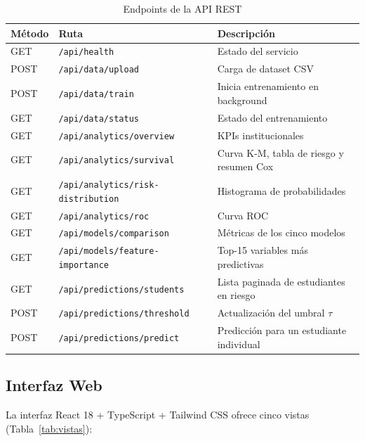 \documentclass[12pt]{article}
\begin{document}
{\begin{table}[H]
\centering
\caption{Endpoints de la API REST}
\label{tab:endpoints}
\begin{tabular}{p{1.5cm}p{5.5cm}p{6cm}}
\toprule
\textbf{Método} & \textbf{Ruta} & \textbf{Descripción} \\
\midrule
GET  & \texttt{/api/health}                    & Estado del servicio \\
POST & \texttt{/api/data/upload}               & Carga de dataset CSV \\
POST & \texttt{/api/data/train}                & Inicia entrenamiento en background \\
GET  & \texttt{/api/data/status}               & Estado del entrenamiento \\
GET  & \texttt{/api/analytics/overview}        & KPIs institucionales \\
GET  & \texttt{/api/analytics/survival}        & Curva K-M, tabla de riesgo y resumen Cox \\
GET  & \texttt{/api/analytics/risk-distribution} & Histograma de probabilidades \\
GET  & \texttt{/api/analytics/roc}             & Curva ROC \\
GET  & \texttt{/api/models/comparison}         & Métricas de los cinco modelos \\
GET  & \texttt{/api/models/feature-importance} & Top-15 variables más predictivas \\
GET  & \texttt{/api/predictions/students}      & Lista paginada de estudiantes en riesgo \\
POST & \texttt{/api/predictions/threshold}     & Actualización del umbral $\tau$ \\
POST & \texttt{/api/predictions/predict}       & Predicción para un estudiante individual \\
\bottomrule
\end{tabular}
\end{table}

\subsection{Interfaz Web}

La interfaz React 18 + TypeScript + Tailwind CSS ofrece cinco vistas (Tabla~\ref{tab:vistas}):

}
\end{document}
